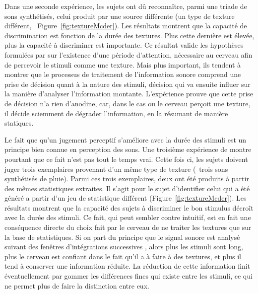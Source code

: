 Dans une seconde expérience, \citep{mcdermott2013summary} les sujets ont dû reconnaître, parmi une triade de sons synthétisés, celui produit par une source différente (\ie un type de texture différent, \Cf~Figure~\ref{fig:textureMcder}). Les résultats montrent que la capacité de discrimination est fonction de la durée des textures. Plus cette dernière est élevée, plus la capacité à discriminer est importante.  Ce résultat valide les hypothèses formulées par \citep{saint1995classification} sur l'existence d'une période d'attention, nécessaire au cerveau afin de percevoir le stimuli comme une texture. Mais plus important, ils tendent à montrer que le processus de traitement de l'information sonore comprend une prise de décision quant à la nature des stimuli, décision qui va  ensuite influer sur la manière d'analyser l'information montante. L'expérience prouve que cette prise de décision n'a rien d'anodine, car, dans le cas ou le cerveau perçoit une texture, il décide sciemment de dégrader l'information, en la résumant de manière statiques.

Le fait que qu'un jugement perceptif s'améliore avec la durée des stimuli est un principe bien connue en perception des sons\citep{moore1973frequency}. Une troisième expérience de \citep{mcdermott2013summary} montre pourtant que ce fait n'est pas tout le temps vrai. Cette fois ci, les sujets doivent juger trois exemplaires provenant d'un même type de texture (\eg~trois sons synthétisés de pluie). Parmi ces trois exemplaires, deux ont été produits à partir des mêmes statistiques extraites. Il s'agit pour le sujet d'identifier celui qui a été généré a partir d'un jeu de statistique différent (Figure~\ref{fig:textureMcder}). Les résultats montrent que la capacité des sujets à discriminer le bon stimulus décroît avec la durée des stimuli. Ce fait, qui peut sembler contre intuitif, est en fait une conséquence directe du choix fait par le cerveau de ne traiter les textures que sur la base de statistiques. Si on part du principe que le signal sonore est analysé suivant des fenêtres d'intégrations successives \citep{yabe1998temporal,poeppel2003analysis}, alors plus les stimuli sont long, plus le cerveau est confiant dans le fait qu'il a à faire à des textures, et plus il tend à conserver une information réduite. La réduction de cette information finit éventuellement par gommer les différences fines qui existe entre les stimuli, ce qui ne permet plus de faire la distinction entre eux.

